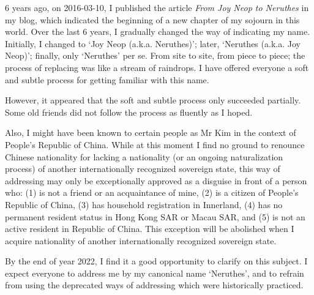 
\begin{multicols*}{2}
6 years ago, on 2016-03-10, I published the article \textit{From Joy Neop to Neruthes} in my blog,
which indicated the beginning of a new chapter of my sojourn in this world.
Over the last 6 years, I gradually changed the way of indicating my name.
Initially, I changed to `Joy Neop (a.k.a. Neruthes)'; later, `Neruthes (a.k.a. Joy Neop)';
finally, only `Neruthes' per se.
From site to site, from piece to piece;
the process of replacing was like a stream of raindrops.
I have offered everyone a soft and subtle process for getting familiar with this name.

However, it appeared that the soft and subtle process only succeeded partially.
Some old friends did not follow the process as fluently as I hoped.

Also, I might have been known to certain people as Mr Kim in the context of People's Republic of China.
While at this moment I find no ground to renounce Chinese nationality for lacking a nationality (or an ongoing naturalization process)
of another internationally recognized sovereign state,
this way of addressing may only be exceptionally approved as a disguise in front of a person who:
(1) is not a friend or an acquaintance of mine,
(2) is a citizen of People's Republic of China,
(3) has household registration in Innerland,
(4) has no permanent resident status in Hong Kong SAR or Macau SAR, and
(5) is not an active resident in Republic of China.
This exception will be abolished when I acquire nationality of another internationally recognized sovereign state.

By the end of year 2022, I find it a good opportunity to clarify on this subject.
I expect everyone to address me by my canonical name `Neruthes',
and to refrain from using the deprecated ways of addressing which were historically practiced.
\end{multicols*}
